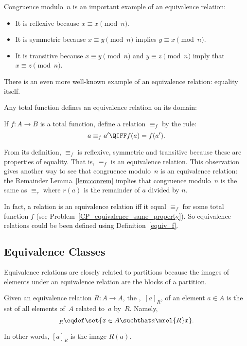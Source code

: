 Congruence modulo~$n$ is an important example of an equivalence
relation:
\begin{itemize}

\item
It is reflexive because $x \equiv x \pmod{n}$.

\item
It is symmetric because $x \equiv y \pmod{n}$ implies $y \equiv x
\pmod{n}$.

\item
It is transitive because $x \equiv y \pmod{n}$ and $y \equiv z
\pmod{n}$ imply that $x \equiv z \pmod{n}$.

\end{itemize}
There is an even more well-known example of an equivalence relation:
equality itself.

Any total function defines an equivalence relation on its domain:
\begin{definition}\label{equiv_f}
If $f:A \to B$ is a total function, define a relation $\equiv_f$ by the rule:
\[
a \equiv_f a'  \QIFF f(a) = f(a').
\]
\end{definition}
From its definition, $\equiv_f$ is reflexive, symmetric and transitive
because these are properties of equality.  That is, $\equiv_f$ is an
equivalence relation.  This observation gives another way to see that
congruence modulo~$n$ is an equivalence relation: the Remainder
Lemma~\ref{lem:conrem} implies that congruence modulo~$n$ is the same
as $\equiv_r$ where $r(a)$ is the remainder of $a$ divided by $n$.

In fact, a relation is an equivalence relation iff it equal $\equiv_f$
for some total function $f$ (see
Problem~\ref{CP_equivalence_same_property}).  So equivalence relations
could be been defined using Definition~\ref{equiv_f}.

\subsection{Equivalence Classes}

Equivalence relations are closely related to partitions because
the images of elements under an equivalence relation are the blocks of
a partition.

\begin{definition}\label{def:equiv_class}
Given an equivalence relation $R : A \to A$, the ,~$[a]_R$, of an element $a \in A$  is the set of all elements of~$A$
related to~$a$ by~$R$.  Namely,
\begin{equation*}
    [a]_R \eqdef \set{x \in A \suchthat a \mrel{R} x}.
\end{equation*}
\end{definition}
In other words, $[a]_R$ is the image $R(a)$.

